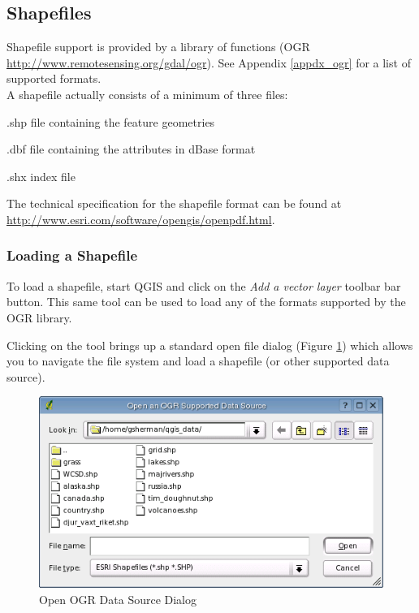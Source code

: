 \documentclass[10pt,english]{article}
\begin{document}
\begin{onehalfspace}
\subsection{Shapefiles}
Shapefile support is provided by a library of functions (OGR
\url{http://www.remotesensing.org/gdal/ogr}). See Appendix \ref{appdx_ogr} for a list of supported formats.\\

A shapefile actually consists of a minimum of three
files:
\begin{compactenum}
\item .shp file containing the feature geometries
\item .dbf file containing the attributes in dBase format
\item .shx index file
\end{compactenum}
The technical specification for the shapefile format can be found at\\
\url{http://www.esri.com/software/opengis/openpdf.html}.
\subsubsection{Loading a Shapefile}
To load a
shapefile, start QGIS and click on the \textit{Add a vector layer} toolbar bar
button. This same tool can be used to load any of the formats supported by the OGR library.

Clicking on the tool brings up a standard open file dialog (Figure \ref{fig:openshapefile}) which allows you to navigate the file system and load a shapefile (or other supported data source). 
\begin{figure}[h]
   \begin{center}
   \caption{Open OGR Data Source Dialog}\label{fig:openshapefile}\smallskip
   \includegraphics[scale=.75]{qgis_user_guide_images/shapefileopendialog}
\end{center}  
   

\end{figure}
\end{onehalfspace}
\end{document}
